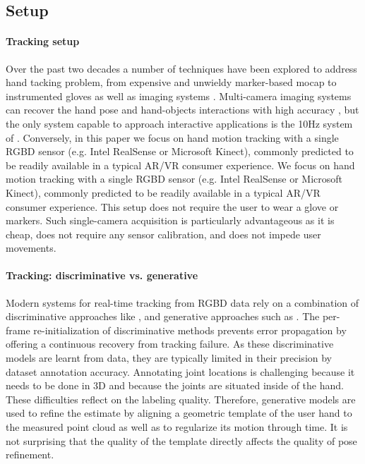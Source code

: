 \subsection*{Setup}

\paragraph{Tracking setup} Over the past two decades a number of techniques have been explored to address hand tacking problem, from expensive and unwieldy marker-based mocap \cite{mocapsurvey} to instrumented gloves \cite{dipietro2008survey} as well as imaging systems \cite{erol2007vision}. Multi-camera imaging systems can recover the hand pose and hand-objects interactions with high accuracy \cite{ballan2013salient}, but the only system capable to approach interactive applications is the 10Hz system of \cite{sridhar2013multicam}. Conversely, in this paper we focus on hand motion tracking with a single RGBD sensor (e.g. Intel RealSense or Microsoft Kinect), commonly predicted to be readily available in a typical AR/VR consumer experience.
We focus on hand motion tracking with a single RGBD sensor (e.g. Intel RealSense or Microsoft Kinect), commonly predicted to be readily available in a typical AR/VR consumer experience. This setup does not require the user to wear a glove or markers. Such single-camera acquisition is particularly advantageous as it is cheap, does not require any sensor calibration, and does not impede user movements.

\paragraph{Tracking: discriminative vs. generative} Modern systems for real-time tracking from RGBD data \cite{sridhar2015fast,sharp2015accurate} rely on a combination of discriminative approaches like \cite{keskin2012hand}, and generative approaches such as \cite{oiko2011hand}. The per-frame re-initialization of discriminative methods prevents error propagation by offering a continuous recovery from tracking failure. As these discriminative models are learnt from data, they are typically limited in their precision by dataset annotation accuracy. Annotating joint locations is challenging because it needs to be done in 3D and because the joints are situated inside of the hand. These difficulties reflect on the labeling quality. Therefore, generative models are used to refine the estimate by aligning a geometric template of the user hand to the measured point cloud as well as to regularize its motion through time. It is not surprising that the quality of the template directly affects the quality of pose refinement.


